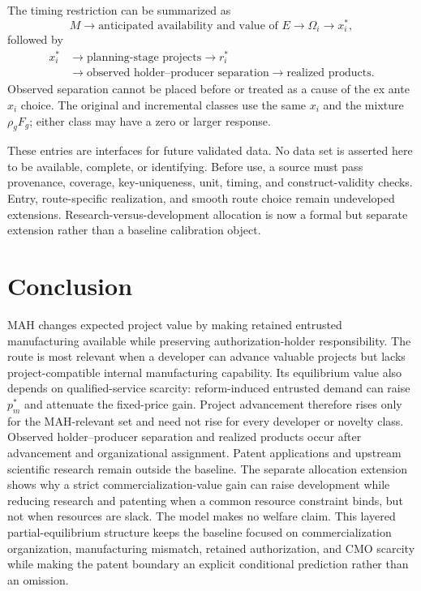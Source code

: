 \documentclass[12pt]{article}
\newcommand{\1}{\mathbf{1}}
\begin{document}
The timing restriction can be summarized as
\begin{equation}
  M
  \longrightarrow
  \text{anticipated availability and value of }E
  \longrightarrow
  \Omega_i
  \longrightarrow
  x_i^*,
  \label{eq:empirical-anticipated-chain}
\end{equation}
followed by
\begin{equation}
  \begin{aligned}
  x_i^*
  &\longrightarrow
  \text{planning-stage projects}
  \longrightarrow r_i^* \\
  &\longrightarrow
  \text{observed holder--producer separation}
  \longrightarrow
  \text{realized products}.
  \end{aligned}
  \label{eq:empirical-realized-chain}
\end{equation}
Observed separation cannot be placed before or treated as a cause of the ex
ante \(x_i\) choice. The original and incremental classes use the same
\(x_i\) and the mixture \(\rho_gF_g\); either class may have a zero or larger
response.

These entries are interfaces for future validated data. No data set is
asserted here to be available, complete, or identifying. Before use, a source
must pass provenance, coverage, key-uniqueness, unit, timing, and
construct-validity checks. Entry, route-specific realization, and smooth
route choice remain undeveloped extensions. Research-versus-development
allocation is now a formal but separate extension rather than a baseline
calibration object.

\section{Conclusion}

MAH changes expected project value by making retained entrusted manufacturing
available while preserving authorization-holder responsibility. The route is
most relevant when a developer can advance valuable projects but lacks
project-compatible internal manufacturing capability. Its equilibrium value
also depends on qualified-service scarcity: reform-induced entrusted demand
can raise \(p_m^*\) and attenuate the fixed-price gain. Project advancement
therefore rises only for the MAH-relevant set and need not rise for every
developer or novelty class. Observed holder--producer separation and realized
products occur after advancement and organizational assignment. Patent
applications and upstream scientific research remain outside the baseline.
The separate allocation extension shows why a strict commercialization-value
gain can raise development while reducing research and patenting when a
common resource constraint binds, but not when resources are slack. The
model makes no welfare claim. This layered partial-equilibrium structure
keeps the baseline focused on commercialization organization, manufacturing
mismatch, retained authorization, and CMO scarcity while making the patent
boundary an explicit conditional prediction rather than an omission.

\clearpage


\end{document}
